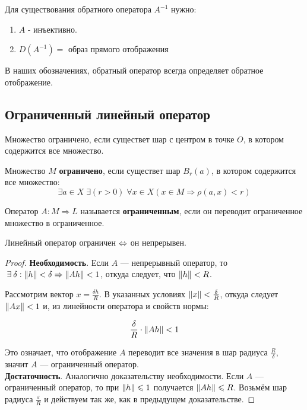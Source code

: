\documentclass[12pt]{article}
\begin{document}
	Для существования обратного оператора $A^{-1}$ нужно:
	\begin{enumerate}
		\item $A$ - инъективно.
		\item $D(A^{-1}) = $ образ прямого отображения
	\end{enumerate}
	В наших обозначениях, обратный оператор всегда определяет обратное отображение.

	\subsection{Ограниченный линейный оператор}	
	
	\begin{defi}
		Множество ограничено, если существет шар с центром в точке $O$, в котором содержится все множество.
	\end{defi}
	\begin{defi}
		Множество $M$ \textbf{ограничено}, если существет шар $B_r(a)$, в котором содержится все множество:
		$$ \exists a \in X \; \exists (r > 0) \; \forall x \in X (x \in M \Rightarrow \rho(a, x) < r) $$
	\end{defi}
	\begin{defi}
		Оператор $A: M \Rightarrow L$ называется \textbf{ограниченным}, если он переводит ограниченное множество
		в ограниченное.
	\end{defi}
	
	\begin{state}
		Линейный оператор ограничен $\Leftrightarrow$ он непрерывен.
	\end{state}
	\begin{proof}
		\textbf{Необходимость}. Если $A$ --- непрерывный оператор, то 
		$ \exists \delta : \norm{h} < \delta \Rightarrow \norm{Ah} < 1 $,
		откуда следует, что $\left\| h \right\| < R$. 
		
		Рассмотрим вектор $x = \frac{\delta h}{R}$. В указанных условиях
		$\left\| x \right\| < \frac{\delta}{R}$, откуда следует $\left\| Ax \right\| < 1$ и, из линейности оператора и свойств нормы:

		$$\frac{\delta}{R} \cdot \left\| Ah \right\| < 1$$
		
		Это означает, что отображение $A$ переводит все значения в шар радиуса $\frac{R}{\delta}$, значит
		$A$ --- ограниченный оператор. \\
		
		\textbf{Достаточность}. Аналогично доказательству необходимости. Если $A$ --- ограниченный оператор,
		то при $\left\| h \right\| \leqslant 1$ получается $\left\| Ah \right\| \leqslant R$. Возьмём шар радиуса $\frac{\varepsilon}{R}$
		и действуем так же, как в предыдущем доказательстве.
	\end{proof}
	
\end{document}
